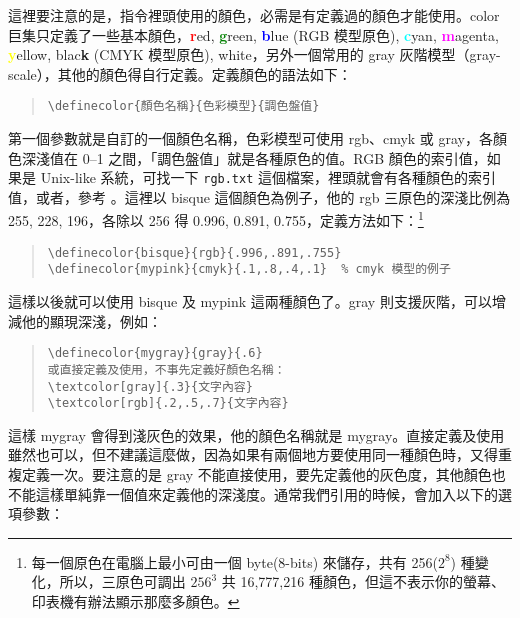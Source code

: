 這裡要注意的是，指令裡頭使用的顏色，必需是有定義過的顏色才能使用。\textsf{color} 巨集只定義了一些基本顏色，\textcolor{red}{\bf r}ed, \textcolor{green}{\bf g}reen, \textcolor{blue}{\bf b}lue (RGB 模型原色), \textcolor{cyan}{\bf c}yan, \textcolor{magenta}{\bf m}agenta, \textcolor{yellow}{\bf y}ellow, blac{\bf k} (CMYK 模型原色), white，另外一個常用的 gray 灰階模型（gray-scale），其他的顏色得自行定義。定義顏色的語法如下：

\begin{quote}
  \begin{verbatim}
\definecolor{顏色名稱}{色彩模型}{調色盤值}
\end{verbatim}
\end{quote}

第一個參數就是自訂的一個顏色名稱，色彩模型可使用 rgb、cmyk 或 gray，各顏色深淺值在 0--1 之間，「調色盤值」就是各種原色的值。RGB 顏色的索引值，如果是 Unix-like 系統，可找一下 \texttt{rgb.txt} 這個檔案，裡頭就會有各種顏色的索引值，或者，參考
。這裡以 bisque 這個顏色為例子，他的 rgb 三原色的深淺比例為 255, 228, 196，各除以 256 得 0.996, 0.891, 0.755，定義方法如下：\footnote{每一個原色在電腦上最小可由一個 byte(8-bits) 來儲存，共有 256($2^8$) 種變化，所以，三原色可調出 $256^3$ 共 16,777,216 種顏色，但這不表示你的螢幕、印表機有辦法顯示那麼多顏色。}

\begin{quote}
  \begin{verbatim}
\definecolor{bisque}{rgb}{.996,.891,.755}
\definecolor{mypink}{cmyk}{.1,.8,.4,.1}  % cmyk 模型的例子
\end{verbatim}
\end{quote}

這樣以後就可以使用 bisque 及 mypink 這兩種顏色了。gray 則支援灰階，可以增減他的顯現深淺，例如：

\begin{quote}
  \begin{verbatim}
\definecolor{mygray}{gray}{.6}
或直接定義及使用，不事先定義好顏色名稱：
\textcolor[gray]{.3}{文字內容}
\textcolor[rgb]{.2,.5,.7}{文字內容}
\end{verbatim}
\end{quote}

這樣 mygray 會得到淺灰色的效果，他的顏色名稱就是 mygray。直接定義及使用雖然也可以，但不建議這麼做，因為如果有兩個地方要使用同一種顏色時，又得重複定義一次。要注意的是 gray 不能直接使用，要先定義他的灰色度，其他顏色也不能這樣單純靠一個值來定義他的深淺度。通常我們引用的時候，會加入以下的選項參數：

